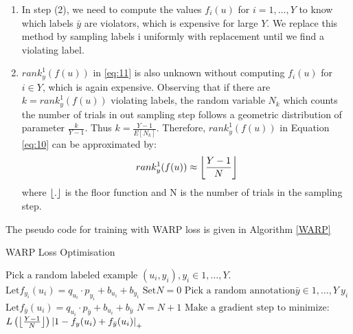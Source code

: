 \begin{enumerate}
	\item In step (2), we need to compute the values \(f_i(u)\) for \( i = 1, \ldots, Y \) to know which labels \(\bar{y}\) are violators, which is expensive for large \(Y\). We replace this method by sampling labels i uniformly with replacement until we find a violating label.
	\item \( rank_y^1 (f(u)) \) in \eqref{eq:11} is also unknown without computing \(f_i(u)\) for \(i \in Y\), which is again expensive. Observing that if there are \(k = rank_y^1(f(u)) \) violating labels, the random variable \(N_k\) which counts the number of trials in out sampling step follows a geometric distribution of parameter \( \frac{k}{Y-1} \). Thus \(k = \frac{Y-1}{E[N_k]}\). Therefore, \(rank_y^1 (f(u))\) in Equation \eqref{eq:10} can be approximated by:
	\begin{displaymath}
		rank_y^1 (f(u)) \approx \floor*{\frac{Y-1}{N}}
	\end{displaymath}
	where \(\floor*{.}\) is the floor function and N is the number of trials in the sampling step.
\end{enumerate} 

The pseudo code for training with WARP loss is given in Algorithm \eqref{WARP}

\begin{algorithm}
\caption{WARP Loss Optimisation} \label{WARP}
\begin{algorithmic}[1]
	\Repeat
	\State $\text{Pick a random labeled example }(u_i, y_i), y_i \in {1, \ldots, Y}.$
	\State $\text{Let} f_{y_i}(u_i) = q_{u_i} \cdot p_{y_i} + b_{u_i} + b_{y_i}$
	\State $\text{Set} N = 0$
	\Repeat
		\State $\text{Pick a random annotation} \bar{y} \in {1, \ldots, Y} \ y_i$
		\State $\text{Let} f_{\bar{y}} (u_i) = q_{u_i} \cdot p_{\bar{y}} + b_{u_i} + b_{\bar{y}}$
		\State $N = N + 1$
		\State $\text{Make a gradient step to minimize:}$
		\State $L \left( \floor*{\frac{Y-1}{N}} \right) {\lvert 1 - f_y(u_i) + f_{\bar{y}} (u_i) \rvert}_+$	
	\EndIf
\EndFunction
\end{algorithmic}
\end{algorithm}
